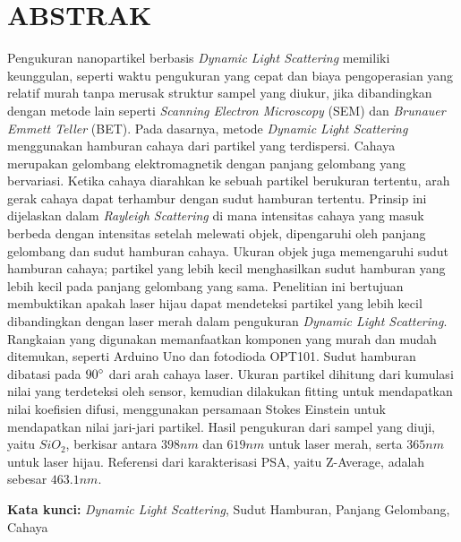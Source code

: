\chapter*{\centering ABSTRAK}

\begin{spacing}{1.25}
\noindent Pengukuran nanopartikel berbasis \textit{Dynamic Light Scattering}
memiliki keunggulan, seperti waktu pengukuran yang cepat dan biaya pengoperasian
yang relatif murah tanpa merusak struktur sampel yang diukur, jika dibandingkan
dengan metode lain seperti \textit{Scanning Electron Microscopy} (SEM) dan 
\textit{Brunauer Emmett Teller} (BET). Pada dasarnya, metode 
\textit{Dynamic Light Scattering} menggunakan hamburan cahaya dari partikel yang
terdispersi. Cahaya merupakan gelombang elektromagnetik dengan panjang gelombang
yang bervariasi. Ketika cahaya diarahkan ke sebuah partikel berukuran tertentu,
arah gerak cahaya dapat terhambur dengan sudut hamburan tertentu. Prinsip ini
dijelaskan dalam \textit{Rayleigh Scattering} di mana intensitas cahaya yang
masuk berbeda dengan intensitas setelah melewati objek, dipengaruhi oleh panjang
gelombang dan sudut hamburan cahaya. Ukuran objek juga memengaruhi sudut hamburan
cahaya; partikel yang lebih kecil menghasilkan sudut hamburan yang lebih kecil
pada panjang gelombang yang sama. Penelitian ini bertujuan membuktikan apakah
laser hijau dapat mendeteksi partikel yang lebih kecil dibandingkan dengan laser
merah dalam pengukuran \textit{Dynamic Light Scattering}. Rangkaian yang
digunakan memanfaatkan komponen yang murah dan mudah ditemukan, seperti
Arduino Uno dan fotodioda OPT101. Sudut hamburan dibatasi pada ${90\degree}$ dari
arah cahaya laser. Ukuran partikel dihitung dari kumulasi nilai yang terdeteksi
oleh sensor, kemudian dilakukan fitting untuk mendapatkan nilai koefisien difusi,
menggunakan persamaan Stokes Einstein untuk mendapatkan nilai jari-jari partikel.
Hasil pengukuran dari sampel yang diuji, yaitu ${SiO_2}$, berkisar antara 
${398 nm}$ dan ${619 nm}$ untuk laser merah, serta ${365 nm}$ untuk laser hijau.
Referensi dari karakterisasi PSA, yaitu Z-Average, adalah sebesar ${463.1 nm}$.


\noindent\textbf{Kata kunci:} \textit{Dynamic Light Scattering}, Sudut Hamburan,
Panjang Gelombang, Cahaya
\end{spacing}